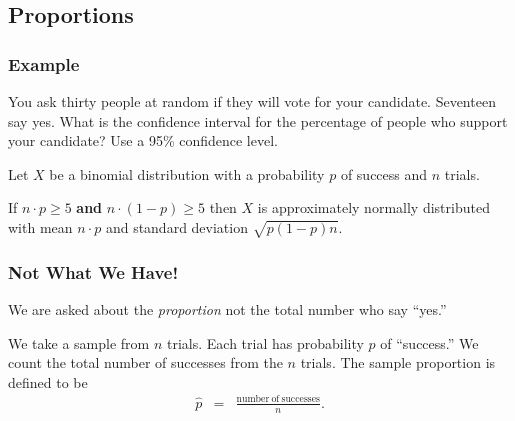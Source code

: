 \subsection{Proportions}

\begin{frame}
  \frametitle{Example}

  You ask thirty people at random if they will vote for your
  candidate. Seventeen say yes. What is the confidence interval for
  the percentage of people who support your candidate? Use a 95\%
  confidence level.

  \vfill

  {
    Let $X$ be a binomial distribution with a probability $p$ of
    success and $n$ trials.
  }

  \vfill

  {
    If $n\cdot p \geq 5$ \textbf{and} $n\cdot (1-p) \geq 5$ then $X$
    is approximately normally distributed with mean $n\cdot p$ and
    standard deviation $\sqrt{p(1-p)n}$.
  }

\end{frame}


\begin{frame}
  \frametitle{Not What We Have!}

  We are asked about the \textit{proportion} not the total number who
  say ``yes.''

  \vfill

  \begin{definition}

    We take a sample from $n$ trials. Each trial has probability $p$
    of ``success.'' We count the total number of successes from the
    $n$ trials.  The sample proportion is defined to be
    \begin{eqnarray*}
      \hat{p} & = & \frac{\mathrm{number~of~successes}}{n}.
    \end{eqnarray*}
    
  \end{definition}



\end{frame}

